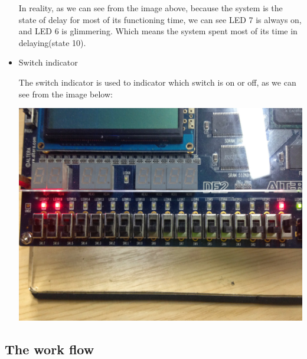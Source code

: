 \documentclass[11pt]{scrartcl}
\begin{document}
\begin{itemize}
\begin{itemize}
    \end{itemize}  
      In reality, as we can see from the image above, because the system is the state of delay for most of its functioning time, we can see LED 7 is always on, and LED 6 is glimmering. Which means the system spent most of its time in delaying(state 10).
      \item Switch indicator
      
      The switch indicator is used to indicator which switch is on or off, as we can see from the image below:
      
    \begin{center}     
\begin{minipage}[t]{\linewidth}

{
\includegraphics[scale = 0.1]{IMG_1387.JPG}
}
\end{minipage}
\medskip
\end{center}
  
    
      
\end{itemize}

\subsection{The work flow}
\end{document}
